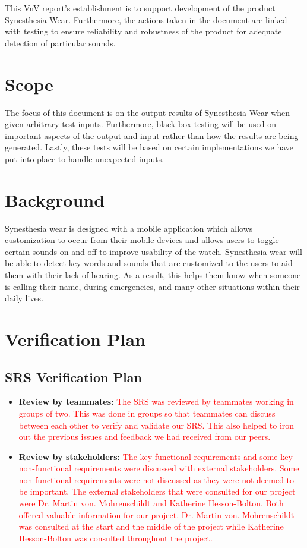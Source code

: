 \documentclass[12pt, titlepage]{article}
\begin{document}
This VnV report's establishment is to support development of the product Synesthesia Wear. Furthermore, the actions taken in the document are linked with testing to ensure reliability and robustness of the product for adequate detection of particular sounds.

\section{Scope}

The focus of this document is on the output results of Synesthesia Wear when given arbitrary test inputs. Furthermore, black box testing will be used on important aspects of the output and input rather than how the results are being generated. Lastly, these tests will be based on certain implementations we have put into place to handle unexpected inputs.

\section{Background} 

Synesthesia wear is designed with a mobile application which allows customization to occur from their mobile devices and allows users to toggle certain sounds on and off to improve usability of the watch. Synesthesia wear will be able to detect key words and sounds that are customized to the users to aid them with their lack of hearing. As a result, this helps them know when someone is calling their name, during emergencies, and many other situations within their daily lives.

\section{Verification Plan}
\subsection{SRS Verification Plan}
\begin{itemize}
  \item \textbf{Review by teammates:} \textcolor{red}{The SRS was reviewed by teammates working in groups of two. This was done in groups so that teammates can discuss between each other to verify and validate our SRS. This also helped to iron out the previous issues and feedback we had received from our peers.}
  \item \textbf{Review by stakeholders:} \textcolor{red}{The key functional requirements and some key non-functional requirements were discussed with external stakeholders. Some non-functional requirements were not discussed as they were not deemed to be important. 
  The external stakeholders that were consulted for our project were Dr. Martin von. Mohrenschildt and Katherine Hesson-Bolton. Both offered valuable information for our project. Dr. Martin von. Mohrenschildt was consulted at the start and the middle of the project while Katherine Hesson-Bolton was consulted throughout the project. 
  } 
\end{itemize}
\end{document}
